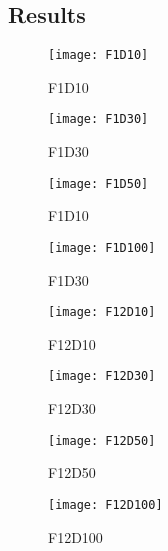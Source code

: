 
%
\subsection{Results}
\begin{figure*}[t]
    \centering
    \begin{subfigure}[b]{0.24\textwidth}
        \texttt{[image: F1D10]}
        \caption{F1D10}
    \end{subfigure}
    \begin{subfigure}[b]{0.24\textwidth}
        \texttt{[image: F1D30]}
        \caption{F1D30}
    \end{subfigure}    
    \begin{subfigure}[b]{0.24\textwidth}
        \texttt{[image: F1D50]}
        \caption{F1D10}
    \end{subfigure}
    \begin{subfigure}[b]{0.24\textwidth}
        \texttt{[image: F1D100]}
        \caption{F1D30}
    \end{subfigure}

    \begin{subfigure}[b]{0.24\textwidth}
        \texttt{[image: F12D10]}
        \caption{F12D10}
    \end{subfigure}
    \begin{subfigure}[b]{0.24\textwidth}
        \texttt{[image: F12D30]}
        \caption{F12D30}
    \end{subfigure}        
    \begin{subfigure}[b]{0.24\textwidth}
        \texttt{[image: F12D50]}
        \caption{F12D50}
    \end{subfigure}
    \begin{subfigure}[b]{0.24\textwidth}
        \texttt{[image: F12D100]}
        \caption{F12D100}
    \end{subfigure}


\end{figure*}
